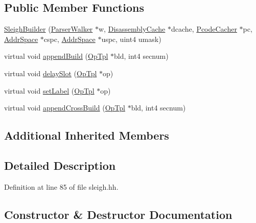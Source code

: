 \subsection*{Public Member Functions}
\begin{DoxyCompactItemize}
\item 
\mbox{\hyperlink{class_sleigh_builder_a6e8bed145454790630677c55bd3250bb}{Sleigh\+Builder}} (\mbox{\hyperlink{class_parser_walker}{Parser\+Walker}} $\ast$w, \mbox{\hyperlink{class_disassembly_cache}{Disassembly\+Cache}} $\ast$dcache, \mbox{\hyperlink{class_pcode_cacher}{Pcode\+Cacher}} $\ast$pc, \mbox{\hyperlink{class_addr_space}{Addr\+Space}} $\ast$cspc, \mbox{\hyperlink{class_addr_space}{Addr\+Space}} $\ast$uspc, uint4 umask)
\item 
virtual void \mbox{\hyperlink{class_sleigh_builder_a9e9d6b0de400f9aa14caf2732b7bfeef}{append\+Build}} (\mbox{\hyperlink{class_op_tpl}{Op\+Tpl}} $\ast$bld, int4 secnum)
\item 
virtual void \mbox{\hyperlink{class_sleigh_builder_aa6cee1d2f18ab2d9e3ff24a41fe80770}{delay\+Slot}} (\mbox{\hyperlink{class_op_tpl}{Op\+Tpl}} $\ast$op)
\item 
virtual void \mbox{\hyperlink{class_sleigh_builder_ad5b3ee580fec7e944389fb51ba798e3c}{set\+Label}} (\mbox{\hyperlink{class_op_tpl}{Op\+Tpl}} $\ast$op)
\item 
virtual void \mbox{\hyperlink{class_sleigh_builder_a343885f1c2044a04ae3587d121a968dd}{append\+Cross\+Build}} (\mbox{\hyperlink{class_op_tpl}{Op\+Tpl}} $\ast$bld, int4 secnum)
\end{DoxyCompactItemize}
\subsection*{Additional Inherited Members}


\subsection{Detailed Description}


Definition at line 85 of file sleigh.\+hh.



\subsection{Constructor \& Destructor Documentation}
\mbox{\label{class_sleigh_builder_a6e8bed145454790630677c55bd3250bb}} 
